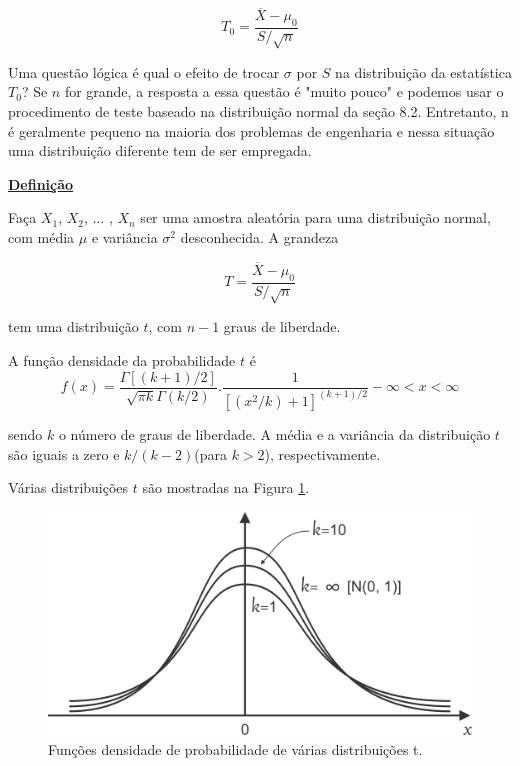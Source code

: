 \documentclass[a4paper,12pt]{article} %
\begin{document}
	\begin{blockquote}
		\begin{equation}
			\tag{8.39}
			T_0 = \frac{\overline{X} - \mu_0}{S / \sqrt{n}}
		\end{equation}  
	\end{blockquote}
	
	Uma questão lógica é qual o efeito de trocar $\sigma$ por $S$ na distribuição da estatística $T_0$? Se $n$ for grande, a resposta a essa questão é "muito pouco" e podemos usar o procedimento de teste baseado na distribuição normal da seção 8.2. Entretanto, n é geralmente pequeno na maioria dos problemas de engenharia e nessa situação uma distribuição diferente tem de ser empregada.
	
	\begin{blockquote}
		\begin{center}
			\textbf{\underline{Definição} } 
		\end{center}
		
		Faça $ X_1 $, $ X_2 $, ... , $ X_n $ ser uma amostra aleatória para uma distribuição normal, com média $\mu$  e variância $\sigma^2$ desconhecida. A grandeza
		
		\begin{equation*}
			T = \frac{\overline{X} - \mu_0}{S / \sqrt{n}}
		\end{equation*}
		
		
		tem uma distribuição $ t $, com $ n-1 $ graus de liberdade.
	\end{blockquote}

	A função densidade da probabilidade $t$ é
	\begin{equation*}
		\tag{8.40}
		f(x) = \frac{\Gamma \left[ \left( k + 1 \right) /2 \right] }{\sqrt{ \pi k  }\Gamma \left( k/2 \right)  } . \frac{1}{\left[ \left( x^2 / k \right) + 1  \right]^{\left( k+1 \right)/2 } } - \infty  < x < \infty 
	\end{equation*}

	sendo $k$ o número de graus de liberdade. A média e a variância da distribuição $t$ são iguais a zero e $ k/(k-2) $(para $  k > 2 $), respectivamente.
	
	\hspace{12pt} Várias distribuições $t$ são mostradas na Figura \ref{8.11}.
	
	
	\begin{figure}[H]
		\centering
		\includegraphics[width=0.7\linewidth]{fig1}
		\caption[]{Funções densidade de probabilidade de várias distribuições t.}
		\label{8.11}
	\end{figure}
\end{document}
